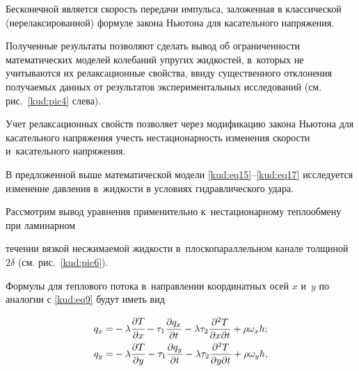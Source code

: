 Бесконечной является скорость передачи импульса, заложенная в классической (нерелаксированной) формуле закона Ньютона для касательного напряжения. 

Полученные результаты позволяют сделать вывод об ограниченности математических моделей колебаний упругих жидкостей, в~которых не учитываются их релаксационные свойства, ввиду существенного отклонения получаемых данных от результатов экспериментальных исследований (см. рис.~\ref{kud:pic4} слева). 

Учет релаксационных свойств позволяет через модификацию закона Ньютона для касательного напряжения учесть нестационарность изменения скорости и~касательного напряжения.



\smallskip








В предложенной выше математической модели \eqref{kud:eq15}--\eqref{kud:eq17} исследуется изменение давления в~жидкости в условиях гидравлического удара. 

Рассмотрим вывод уравнения применительно к~нестационарному теплообмену при ламинарном

течении вязкой несжимаемой жидкости в~плоскопараллельном канале  толщиной $2\delta$ (см. рис.~\ref{kud:pic6}). 

Формулы для теплового потока в~направлении координатных осей $x$ и~$y$ по аналогии с \eqref{kud:eq9} будут иметь вид~\cite{kud:bib17}

\begin{equation}

\label{kud:eq19}

\begin{aligned}

 q_x =&- \lambda\cfrac{\partial T}{\partial x}- \tau_1

\frac{\partial q_x }{\partial t}- \lambda \tau _2 \frac{\partial

^2T}{\partial x\partial t}+ \rho \omega _x h; \\

 q_y =&- \lambda \frac{\partial T}{\partial y}- \tau_1

\frac{\partial q_y }{\partial t}- \lambda \tau_2 \frac{\partial

^2T}{\partial y\partial t}+ \rho \omega_y h,

 \end{aligned}

\end{equation}


